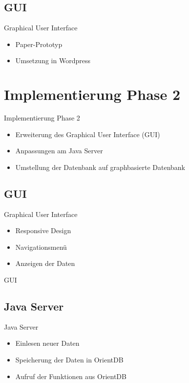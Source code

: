 \documentclass[aspectratio=169]{beamer}
\begin{document}
\subsection{GUI}
\begin{frame}{Graphical User Interface}
  \begin{itemize}
    \item Paper-Prototyp
    \item Umsetzung in Wordpress
  \end{itemize}
\end{frame}

\section{Implementierung Phase 2}

\begin{frame}{Implementierung Phase 2}
  \begin{itemize}
  	\item Erweiterung des Graphical User Interface (GUI)
  	\item Anpassungen am Java Server
  	\item Umstellung der Datenbank auf graphbasierte Datenbank
  \end{itemize}
\end{frame}

\subsection{GUI}

\begin{frame}{Graphical User Interface}
  \begin{itemize}
  	\item Responsive Design
  	\item Navigationsmenü
  	\item Anzeigen der Daten
  \end{itemize}
\end{frame}

\begin{frame}{GUI}
\end{frame}

\subsection{Java Server}

\begin{frame}{Java Server}
  \begin{itemize}
  	\item Einlesen neuer Daten
  	\item Speicherung der Daten in OrientDB
  	\item Aufruf der Funktionen aus OrientDB
  \end{itemize}
\end{frame}
\end{document}
